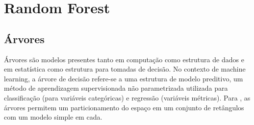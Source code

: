 \section{Random Forest}




\subsection{Árvores}

Árvores são modelos presentes tanto em computação como estrutura de dados e em estatística como estrutura para tomadas de decisão. No contexto de machine learning, a árvore de decisão refere-se a uma estrutura de modelo preditivo, um método de aprendizagem supervisionada não parametrizada utilizada para classificação (para variáveis categóricas) e regressão (variáveis métricas). Para , as árvores permitem um particionamento do espaço em um conjunto de retângulos com um modelo simple em cada. 

\begin{comment}
//por figura
Legenda
Neste exemplo \cite{HASTIE}, observa-se que o particionamento num espaço bidimensional, gerando 5 regiões. Ao lado, está a árvore que gerou esse particionamento.
Trata-se de uma representação de regras que dividem as observações em grupos com características em comum. Em geral, considera-se a hipótese de que cada característica possui um domínio finito e discreto.
\end{comment}



